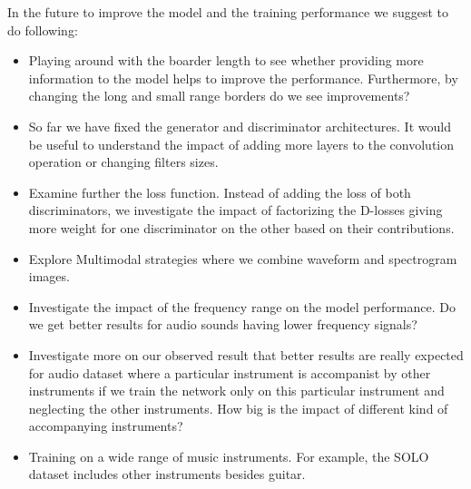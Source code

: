 \documentclass{article} %
\begin{document}
In the future to improve the model and the training performance we suggest to do following:
\begin{itemize}
    \item Playing around with the boarder length to see whether providing more information to the model helps to improve the performance. Furthermore, by changing the long and small range borders do we see improvements?
    \item So far we have fixed the generator and discriminator architectures. It would be useful to understand the impact of adding more layers to the convolution operation or changing filters sizes.
    \item Examine further the loss function. Instead of adding the loss of both discriminators, we investigate the impact of factorizing the D-losses giving more weight for one discriminator on the other based on their contributions.
    \item Explore Multimodal strategies where we combine waveform and spectrogram images.
    \item Investigate the impact of the frequency range on the model performance. Do we get better results for audio sounds having lower frequency signals?
    \item Investigate more on our observed result that better results are really expected for audio dataset where a particular instrument is accompanist by other instruments if we train the network only on this particular instrument and neglecting the other instruments. How big is the impact of different kind of accompanying instruments?
    \item Training on a wide range of music instruments. For example, the SOLO dataset includes other instruments besides guitar.
 
\end{itemize}





\end{document}

